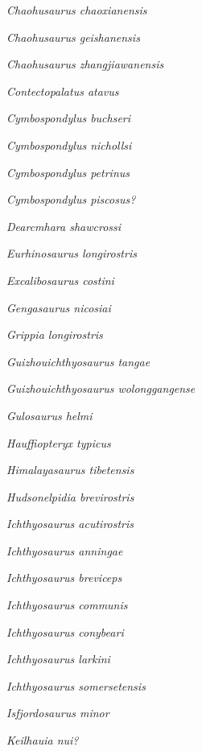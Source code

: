 \emph{Chaohusaurus chaoxianensis}~

\emph{Chaohusaurus geishanensis}~

\emph{Chaohusaurus zhangjiawanensis}~

\emph{Contectopalatus atavus}~

\emph{Cymbospondylus buchseri}~

\emph{Cymbospondylus nichollsi}~

\emph{Cymbospondylus petrinus}~

\emph{Cymbospondylus piscosus?}~

\emph{Dearcmhara shawcrossi}~

\emph{Eurhinosaurus longirostris}~

\emph{Excalibosaurus costini}~

\emph{Gengasaurus nicosiai}~

\emph{Grippia longirostris}~

\emph{Guizhouichthyosaurus tangae}~

\emph{Guizhouichthyosaurus wolonggangense}~

\emph{Gulosaurus helmi}~

\emph{Hauffiopteryx typicus}~

\emph{Himalayasaurus tibetensis}~

\emph{Hudsonelpidia brevirostris}~

\emph{Ichthyosaurus acutirostris}~

\emph{Ichthyosaurus anningae}~

\emph{Ichthyosaurus breviceps}~

\emph{Ichthyosaurus communis}~

\emph{Ichthyosaurus conybeari}~

\emph{Ichthyosaurus larkini}~

\emph{Ichthyosaurus somersetensis}~

\emph{Isfjordosaurus minor}~

\emph{Keilhauia nui?}~

